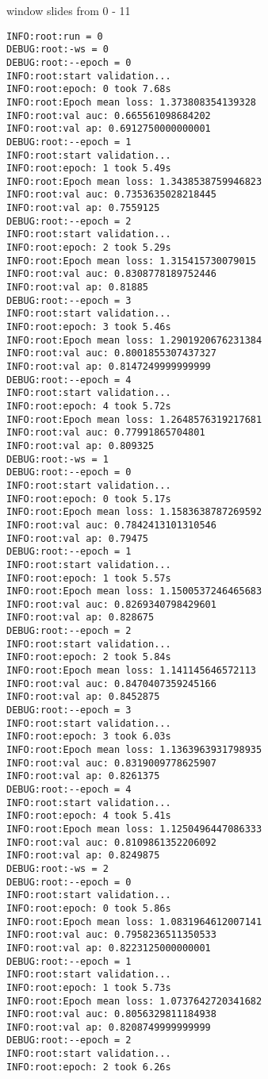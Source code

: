 \documentclass[11pt]{article}
\begin{document}
window slides from 0 - 11
\begin{verbatim}
INFO:root:run = 0
DEBUG:root:-ws = 0
DEBUG:root:--epoch = 0
INFO:root:start validation...
INFO:root:epoch: 0 took 7.68s
INFO:root:Epoch mean loss: 1.373808354139328
INFO:root:val auc: 0.665561098684202
INFO:root:val ap: 0.6912750000000001
DEBUG:root:--epoch = 1
INFO:root:start validation...
INFO:root:epoch: 1 took 5.49s
INFO:root:Epoch mean loss: 1.3438538759946823
INFO:root:val auc: 0.7353635028218445
INFO:root:val ap: 0.7559125
DEBUG:root:--epoch = 2
INFO:root:start validation...
INFO:root:epoch: 2 took 5.29s
INFO:root:Epoch mean loss: 1.315415730079015
INFO:root:val auc: 0.8308778189752446
INFO:root:val ap: 0.81885
DEBUG:root:--epoch = 3
INFO:root:start validation...
INFO:root:epoch: 3 took 5.46s
INFO:root:Epoch mean loss: 1.2901920676231384
INFO:root:val auc: 0.8001855307437327
INFO:root:val ap: 0.8147249999999999
DEBUG:root:--epoch = 4
INFO:root:start validation...
INFO:root:epoch: 4 took 5.72s
INFO:root:Epoch mean loss: 1.2648576319217681
INFO:root:val auc: 0.77991865704801
INFO:root:val ap: 0.809325
DEBUG:root:-ws = 1
DEBUG:root:--epoch = 0
INFO:root:start validation...
INFO:root:epoch: 0 took 5.17s
INFO:root:Epoch mean loss: 1.1583638787269592
INFO:root:val auc: 0.7842413101310546
INFO:root:val ap: 0.79475
DEBUG:root:--epoch = 1
INFO:root:start validation...
INFO:root:epoch: 1 took 5.57s
INFO:root:Epoch mean loss: 1.1500537246465683
INFO:root:val auc: 0.8269340798429601
INFO:root:val ap: 0.828675
DEBUG:root:--epoch = 2
INFO:root:start validation...
INFO:root:epoch: 2 took 5.84s
INFO:root:Epoch mean loss: 1.141145646572113
INFO:root:val auc: 0.8470407359245166
INFO:root:val ap: 0.8452875
DEBUG:root:--epoch = 3
INFO:root:start validation...
INFO:root:epoch: 3 took 6.03s
INFO:root:Epoch mean loss: 1.1363963931798935
INFO:root:val auc: 0.8319009778625907
INFO:root:val ap: 0.8261375
DEBUG:root:--epoch = 4
INFO:root:start validation...
INFO:root:epoch: 4 took 5.41s
INFO:root:Epoch mean loss: 1.1250496447086333
INFO:root:val auc: 0.8109861352206092
INFO:root:val ap: 0.8249875
DEBUG:root:-ws = 2
DEBUG:root:--epoch = 0
INFO:root:start validation...
INFO:root:epoch: 0 took 5.86s
INFO:root:Epoch mean loss: 1.0831964612007141
INFO:root:val auc: 0.7958236511350533
INFO:root:val ap: 0.8223125000000001
DEBUG:root:--epoch = 1
INFO:root:start validation...
INFO:root:epoch: 1 took 5.73s
INFO:root:Epoch mean loss: 1.0737642720341682
INFO:root:val auc: 0.8056329811184938
INFO:root:val ap: 0.8208749999999999
DEBUG:root:--epoch = 2
INFO:root:start validation...
INFO:root:epoch: 2 took 6.26s

\end{verbatim}
\end{document}

